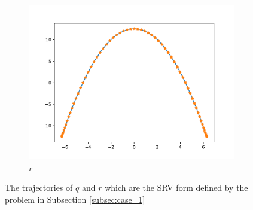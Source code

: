 \begin{figure}[b]
    \begin{subfigure}[t]{0.5\textwidth}
        \centering
        \includegraphics[width=\linewidth]{figures/curve_1/curve_r.pdf}
        \caption{\(r\)}\label{fig:curve_1_r}
    \end{subfigure}
    \caption{The trajectories of \(q\) and \(r\) which are the SRV form defined by the problem in Subsection \ref{subsec:case_1}}\label{fig:curve_1}
\end{figure}


